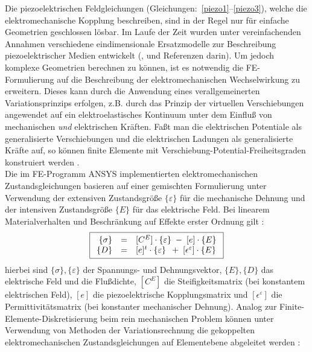 Die piezoelektrischen Feldgleichungen
(Gleichungen:~\ref{piezo1}--\ref{piezo3}), welche die elektromechanische
Kopplung beschreiben, sind in der Regel nur für
einfache Geometrien geschlossen lösbar. Im Laufe der Zeit wurden unter
vereinfachenden Annahmen verschiedene eindimensionale Ersatzmodelle zur
Beschreibung piezoelektrischer Medien entwickelt (\cite{Ler90},
und Referenzen darin). Um jedoch
komplexe Geometrien berechnen zu können, ist es notwendig die FE-Formulierung
auf die Beschreibung der elektromechanischen Wechselwirkung zu erweitern.
Dieses kann durch die Anwendung eines verallgemeinerten Variationsprinzips
erfolgen, z.B. durch das Prinzip der virtuellen Verschiebungen angewendet auf
ein elektroelastisches Kontinuum unter dem Einfluß von mechanischen {\em und}
elektrischen Kräften. Faßt man die elektrischen Potentiale als generalisierte
Verschiebungen und die elektrischen Ladungen als generalisierte Kräfte auf,
so können finite Elemente mit
\glqq Verschiebung-Potential\grqq-Freiheitsgraden
konstruiert werden \cite{All70}. \\
%
Die im FE-Programm {\sf ANSYS} implementierten
elektromechanischen Zustandsgleichungen basieren auf einer gemischten
Formulierung unter Verwendung der extensiven Zustandsgröße $\{\varepsilon\}$
für die mechanische Dehnung und der intensiven Zustandsgröße $\{E\}$ für das
elektrische Feld. Bei linearem Materialverhalten und Beschränkung auf
Effekte erster Ordnung gilt \cite{Koh92}:
\begin{equation}
\fbox{$
 \displaystyle
 \begin{array}{rcl}
\label{piezofem1}
 \{\sigma\} & = & [C^{E}] \cdot \{\varepsilon\} \; - \; [e] \cdot \{E\} \\
\label{piezofem2}
 \{D\} & = & [e]^{t} \cdot \{\varepsilon\} \; \: + \;
  [\epsilon^{\varepsilon}] \cdot \{E \}
 \end{array}
 $}
\end{equation}
hierbei sind $\{\sigma\}, \{\varepsilon\}$ der Spannungs- und Dehnungsvektor,
$\{E\}, \{D\}$ das elektrische Feld und die Flußdichte, $[C^{E}]$ die
Steifigkeitsmatrix (bei konstantem elektrischen Feld), $[e]$ die
piezoelektrische Kopplungsmatrix und $[\epsilon^{\varepsilon}]$ die
Permittivitätsmatrix (bei konstanter mechanischer Dehnung). Analog zur
Finite-Elemente-Diskretisierung beim rein mechanischen Problem können
unter Verwendung von Methoden der Variationsrechnung die
gekoppelten elektromechanischen Zustandsgleichungen auf Elementebene
abgeleitet werden \cite{All70}:
